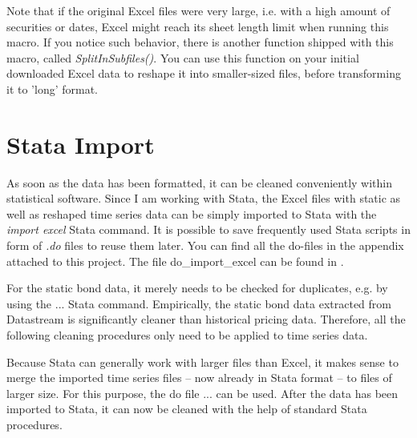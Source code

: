 Note that if the original Excel files were very large, i.e. with a high amount of securities or dates, Excel might reach its sheet length limit when running this macro. If you notice such behavior, there is another function shipped with this macro, called \textit{SplitInSubfiles()}. You can use this function on your initial downloaded Excel data to reshape it into smaller-sized files, before transforming it to 'long' format. 

\section{Stata Import} \label{section:data-cleaning}
As soon as the data has been formatted, it can be cleaned conveniently within statistical software. Since I am working with Stata, the Excel files with static as well as reshaped time series data can be simply imported to Stata with the  \textit{import excel} Stata command. It is possible to save frequently used Stata scripts in form of \textit{.do} files to reuse them later. You can find all the do-files in the appendix attached to this project. The file do\_import\_excel can be found in . %

For the static bond data, it merely needs to be checked for duplicates, e.g. by using the ... Stata command. %
Empirically, the static bond data extracted from Datastream is significantly cleaner than historical pricing data. 
Therefore, all the following cleaning procedures only need to be applied to time series data.

Because Stata can generally work with larger files than Excel, it makes sense to merge the imported time series files -- now already in Stata format -- to files of larger size. For this purpose, the do file ... can be used. %
After the data has been imported to Stata, it can now be cleaned with the help of standard Stata procedures.  

